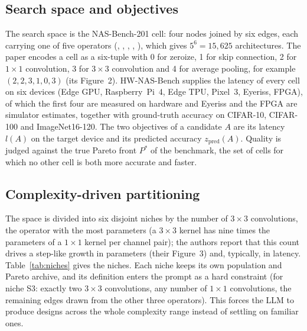 \subsection{Search space and objectives}
The search space is the NAS-Bench-201 cell: four nodes joined by six edges, each carrying one of five operators (, , , , ), which gives $5^6=15{,}625$ architectures. The paper encodes a cell as a six-tuple with 0 for zeroize, 1 for skip connection, 2 for $1{\times}1$ convolution, 3 for $3{\times}3$ convolution and 4 for average pooling, for example $(2,2,3,1,0,3)$ (its Figure~2). HW-NAS-Bench \cite{hwnasbench} supplies the latency of every cell on six devices (Edge GPU, Raspberry~Pi~4, Edge TPU, Pixel~3, Eyeriss, FPGA), of which the first four are measured on hardware and Eyeriss and the FPGA are simulator estimates, together with ground-truth accuracy on CIFAR-10, CIFAR-100 and ImageNet16-120. The two objectives of a candidate $A$ are its latency $l(A)$ on the target device and its predicted accuracy $z_{\mathrm{pred}}(A)$. Quality is judged against the true Pareto front $P^\ast$ of the benchmark, the set of cells for which no other cell is both more accurate and faster.

\subsection{Complexity-driven partitioning}
The space is divided into six disjoint niches by the number of $3{\times}3$ convolutions, the operator with the most parameters (a $3{\times}3$ kernel has nine times the parameters of a $1{\times}1$ kernel per channel pair); the authors report that this count drives a step-like growth in parameters (their Figure~3) and, typically, in latency. Table~\ref{tab:niches} gives the niches. Each niche keeps its own population and Pareto archive, and its definition enters the prompt as a hard constraint (for niche S3: exactly two $3{\times}3$ convolutions, any number of $1{\times}1$ convolutions, the remaining edges drawn from the other three operators). This forces the LLM to produce designs across the whole complexity range instead of settling on familiar ones.

